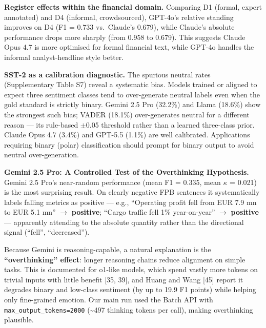 \documentclass[11pt]{article}
\begin{document}
\textbf{Register effects within the financial domain.} Comparing D1
(formal, expert annotated) and D4 (informal, crowdsourced), GPT-4o's
relative standing improves on D4 (F1 = 0.733 vs.~Claude's 0.679), while
Claude's absolute performance drops more sharply (from 0.958 to 0.679).
This suggests Claude Opus 4.7 is more optimised for formal financial
text, while GPT-4o handles the informal analyst-headline style better.

\textbf{SST-2 as a calibration diagnostic.} The spurious neutral rates
(Supplementary Table S7) reveal a systematic bias. Models trained or
aligned to expect three sentiment classes tend to over-generate neutral
labels even when the gold standard is strictly binary. Gemini 2.5 Pro
(32.2\%) and Llama (18.6\%) show the strongest such bias; VADER (18.1\%)
over-generates neutral for a different reason --- its rule-based $\pm$0.05
threshold rather than a learned three-class prior. Claude Opus 4.7
(3.4\%) and GPT-5.5 (1.1\%) are well calibrated. Applications requiring
binary (polar) classification should prompt for binary output to avoid
neutral over-generation.

\textbf{Gemini 2.5 Pro: A Controlled Test of the Overthinking
Hypothesis.} Gemini 2.5 Pro's near-random performance (mean F1 = 0.335,
mean $\kappa$ = 0.021) is the most surprising result. On clearly negative FPB
sentences it systematically labels falling metrics as positive --- e.g.,
``Operating profit fell from EUR 7.9 mn to EUR 5.1 mn'' $\rightarrow$
\textbf{positive}; ``Cargo traffic fell 1\% year-on-year'' $\rightarrow$
\textbf{positive} --- apparently attending to the absolute quantity
rather than the directional signal (``fell'', ``decreased'').

Because Gemini is reasoning-capable, a natural explanation is the
\textbf{``overthinking'' effect}: longer reasoning chains reduce
alignment on simple tasks. This is documented for o1-like models, which
spend vastly more tokens on trivial inputs with little benefit {[}35,
39{]}, and Huang and Wang {[}45{]} report it degrades binary and
low-class sentiment (by up to 19.9 F1 points) while helping only
fine-grained emotion. Our main run used the Batch API with
\texttt{max\_\allowbreak{}output\_\allowbreak{}tokens=2000} (\textasciitilde497 thinking tokens
per call), making overthinking plausible.
\end{document}
